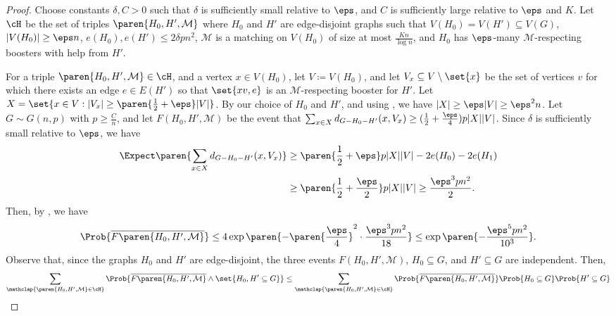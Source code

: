 \documentclass[10pt,a4paper,reqno]{amsart}
\begin{document}
\begin{proof}
Choose constants $\delta, C > 0$ such that $\delta$ is sufficiently small relative to $\eps$, and $C$ is sufficiently large relative to $\eps$ and $K$. Let $\cH$ be the set of triples $\paren{H_0, H', \mathcal{M}}$ where $H_0$ and $H'$ are edge-disjoint graphs such that $V(H_0) = V(H') \subseteq V(G)$, $|V(H_0)| \geq \eps n$, $e(H_0), e(H') \leq 2\delta pn^2$, $\mathcal{M}$ is a matching on $V(H_0)$ of size at most $\frac{K n}{\log{n}}$, and $H_0$ has $\eps$-many $\mathcal{M}$-respecting boosters with help from $H'$.

For a triple $\paren{H_0, H',\mathcal{M}} \in \cH$, and a vertex $x \in V(H_0)$, let $V \coloneqq V(H_0)$, and let $V_x\subseteq V \setminus \set{x}$ be the set of vertices $v$ for which there exists an edge $e \in E(H')$ so that $\set{xv, e}$ is an $\mathcal{M}$-respecting booster for $H'$. Let $X = \set{x \in V : |V_x| \geq \paren{\frac{1}{2} + \eps} |V|}$. By our choice of $H_0$ and $H'$, and using , we have $|X| \geq \eps |V| \geq \eps^2 n$. Let $G \sim G(n, p)$ with $p \geq \frac{C}{n}$, and let $F(H_0, H',\mathcal{M})$ be the event that ${\sum_{x \in X} d_{G - H_0 - H'}(x, V_x) \geq (\frac{1}{2} + \frac{\eps}{4}) p |X| |V|}$. Since $\delta$ is sufficiently small relative to $\eps$, we have
\begin{align*}
    \Expect\paren{\sum_{x \in X} d_{G - H_0 - H'}(x, V_x)} 
    &\geq \paren{\frac{1}{2} + \eps} p |X||V| - 2e(H_0) - 2e(H_1) \\
    &\geq \paren{\frac{1}{2} + \frac{\eps}{2}} p |X| |V| \geq \frac{\eps^3 p n^2}{2}.
\end{align*}
Then, by , we have
\begin{equation*}
    \Prob{\overline{F\paren{H_0, H',\mathcal{M}}}} \leq 4 \exp\paren{-\paren{\frac{\eps}{4}}^2 \cdot \frac{\eps^3 p n^2}{18}} \leq \exp\paren{-\frac{\eps^5 p n^2}{10^3}}.
\end{equation*}
Observe that, since the graphs $H_0$ and $H'$ are edge-disjoint, the three events $F(H_0, H',\mathcal{M})$, $H_0 \subseteq G$, and $H' \subseteq G$ are independent. Then,
\begin{align*}
    \sum_{\mathclap{\paren{H_0, H',\mathcal{M}} \in \cH}} \Prob{\overline{F\paren{H_0, H',\mathcal{M}}} \land \set{H_0, H'\subseteq G}} 
    &\leq \sum_{\mathclap{\paren{H_0, H',\mathcal{M}} \in \cH}} \Prob{\overline{F\paren{H_0, H',\mathcal{M}}}} \Prob{H_0\subseteq G} \Prob{H' \subseteq G} \\

\end{align*}
\end{proof}
\end{document}
